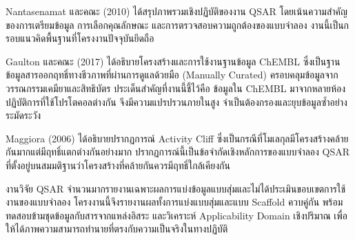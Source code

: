 Nantasenamat และคณะ (2010) ได้สรุปภาพรวมเชิงปฏิบัติของงาน QSAR โดยเน้นความสำคัญของการเตรียมข้อมูล การเลือกคุณลักษณะ และการตรวจสอบความถูกต้องของแบบจำลอง งานนี้เป็นกรอบแนวคิดพื้นฐานที่โครงงานปัจจุบันยึดถือ

Gaulton และคณะ (2017) ได้อธิบายโครงสร้างและการใช้งานฐานข้อมูล ChEMBL ซึ่งเป็นฐานข้อมูลสารออกฤทธิ์ทางชีวภาพที่ผ่านการดูแลด้วยมือ (Manually Curated) ครอบคลุมข้อมูลจากวรรณกรรมเคมียาและสิทธิบัตร ประเด็นสำคัญที่งานนี้ชี้ไว้คือ ข้อมูลใน ChEMBL มาจากหลายห้องปฏิบัติการที่ใช้โปรโตคอลต่างกัน จึงมีความแปรปรวนภายในสูง จำเป็นต้องกรองและยุบข้อมูลซ้ำอย่างระมัดระวัง

Maggiora (2006) ได้อธิบายปรากฏการณ์ Activity Cliff ซึ่งเป็นกรณีที่โมเลกุลมีโครงสร้างคล้ายกันมากแต่มีฤทธิ์แตกต่างกันอย่างมาก ปรากฏการณ์นี้เป็นข้อจำกัดเชิงหลักการของแบบจำลอง QSAR ที่ตั้งอยู่บนสมมติฐานว่าโครงสร้างที่คล้ายกันควรมีฤทธิ์ใกล้เคียงกัน

\begin{keynote}
งานวิจัย QSAR จำนวนมากรายงานเฉพาะผลการแบ่งข้อมูลแบบสุ่มและไม่ได้ประเมินขอบเขตการใช้งานของแบบจำลอง โครงงานนี้จึงรายงานผลทั้งการแบ่งแบบสุ่มและแบบ Scaffold ควบคู่กัน พร้อมทดสอบข้ามชุดข้อมูลกับสารจากแหล่งอิสระ และวิเคราะห์ Applicability Domain เชิงปริมาณ เพื่อให้ได้ภาพความสามารถทำนายที่ตรงกับความเป็นจริงในทางปฏิบัติ
\end{keynote}
